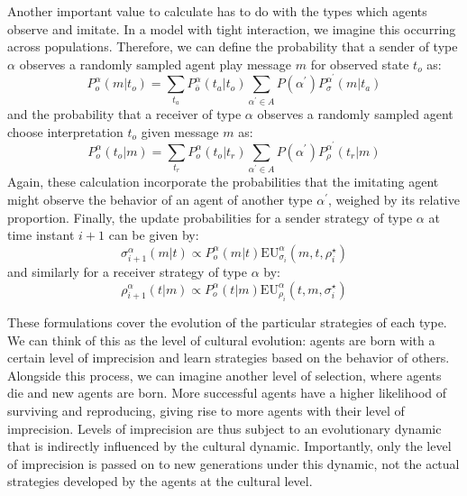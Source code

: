 \documentclass[a4paper]{article}
\begin{document}
Another important value to calculate has to do with the types which agents observe and imitate.
In a model with tight interaction, we imagine this occurring across populations.
Therefore, we can define the probability that a sender of type $\alpha$ observes a randomly sampled agent play message $m$ for observed state $t_o$ as:
$$
P_{o}^{\alpha}(m|t_{o})=\sum_{t_{a}}P_{\bar{o}}^{\alpha}(t_{a}|t_{o})\sum_{\alpha^{\prime}\in A}P(\alpha^{\prime})P_{\sigma}^{\alpha^{\prime}}(m|t_{a})
$$
and the probability that a receiver of type $\alpha$ observes a randomly sampled agent choose interpretation $t_o$ given message $m$ as:
$$
P_{o}^{\alpha}(t_{o}|m)=\sum_{t_{r}}P_{o}^{\alpha}(t_{o}|t_{r})\sum_{\alpha^{\prime}\in A}P(\alpha^{\prime})P_{\rho}^{\alpha^{\prime}}(t_{r}|m)
$$
Again, these calculation incorporate the probabilities that the imitating agent might observe the behavior of an agent of another type $\alpha^\prime$, weighed by its relative proportion.
%
Finally, the update probabilities for a sender strategy of type $\alpha$ at time instant $i+1$ can be given by:
$$
\sigma_{i+1}^{\alpha}(m|t) \propto P_{o}^{\alpha}(m|t)\text{EU}_{\sigma_{i}}^{\alpha}(m,t,\rho_{i}^{\star})
$$
and similarly for a receiver strategy of type $\alpha$ by:
$$
\rho_{i+1}^{\alpha}(t|m) \propto P_{o}^{\alpha}(t|m)\text{EU}_{\rho_{i}}^{\alpha}(t,m,\sigma_{i}^{\star})
$$

These formulations cover the evolution of the particular strategies of each type.
We can think of this as the level of cultural evolution: agents are born with a certain level of imprecision and learn strategies based on the behavior of others.
Alongside this process, we can imagine another level of selection, where agents die and new agents are born.
More successful agents have a higher likelihood of surviving and reproducing, giving rise to more agents with their level of imprecision.
Levels of imprecision are thus subject to an evolutionary dynamic that is indirectly influenced by the cultural dynamic.
Importantly, only the level of imprecision is passed on to new generations under this dynamic, not the actual strategies developed by the agents at the cultural level.
\end{document}

